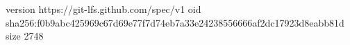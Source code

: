 version https://git-lfs.github.com/spec/v1
oid sha256:f0b9abc425969c67d69e77f7d74eb7a33e24238556666af2dc17923d8eabb81d
size 2748
